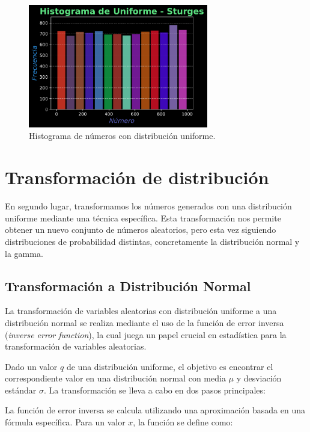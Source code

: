 \documentclass[11pt]{article} %
\begin{document}
	\begin{figure}[h]
		\centering
		\includegraphics[width=0.7\textwidth]{../transformaciones/hist_uniform_Sturges.pdf}
		\caption{Histograma de números con distribución uniforme.}
		\label{fig:randomsUniforme}
	\end{figure}
	
	
	\section{Transformación de distribución}
	
	En segundo lugar, transformamos los números generados con una distribución uniforme mediante una técnica específica. Esta transformación nos permite obtener un nuevo conjunto de números aleatorios, pero esta vez siguiendo distribuciones de probabilidad distintas, concretamente la distribución normal y la gamma.
	
	\subsection{Transformación a Distribución Normal}
	
	La transformación de variables aleatorias con distribución uniforme a una distribución normal se realiza mediante el uso de la función de error inversa (\textit{inverse error function}), la cual juega un papel crucial en estadística para la transformación de variables aleatorias.
	
	Dado un valor $q$ de una distribución uniforme, el objetivo es encontrar el correspondiente valor en una distribución normal con media $\mu$ y desviación estándar $\sigma$. La transformación se lleva a cabo en dos pasos principales:
	
	\newpage
	La función de error inversa se calcula utilizando una aproximación basada en una fórmula específica. Para un valor $x$, la función se define como:
	
\end{document}
